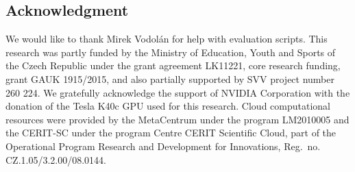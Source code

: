 \documentclass{itatnew}
\def\PB#1{\textcolor{red}{PB: \textit{#1}}}
\begin{document}
\subsection*{Acknowledgment}
We would like to thank Mirek Vodolán for help with evaluation scripts.
This research was partly funded by the Ministry of Education, Youth and Sports of the Czech Republic under the grant agreement LK11221, core research funding, grant GAUK 1915/2015, and also partially supported by SVV project number 260 224. 
We gratefully acknowledge the support of NVIDIA Corporation with the donation of the Tesla K40c GPU used for this research.
Cloud computational resources were provided by the MetaCentrum under the program LM2010005 and the CERIT-SC under the program Centre CERIT Scientific Cloud, part of the Operational Program Research and Development for Innovations, Reg.\ no. CZ.1.05/3.2.00/08.0144.



\end{document}
